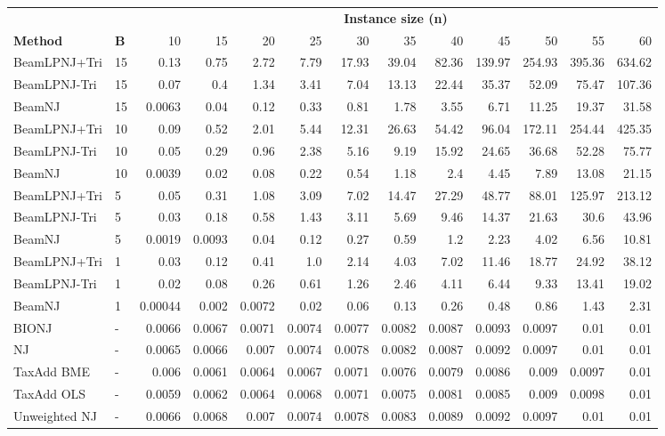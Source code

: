 \begin{tabular}{llrrrrrrrrrrr}
\toprule
&& \multicolumn{11}{c}{\textbf{Instance size (n)}} \\
\cmidrule(lr){3-13}
\textbf{Method} & \textbf{B} & 10 & 15 & 20 & 25 & 30 & 35 & 40 & 45 & 50 & 55 & 60 \\
\midrule
BeamLPNJ+Tri & 15 & 0.13 & 0.75 & 2.72 & 7.79 & 17.93 & 39.04 & 82.36 & 139.97 & 254.93 & 395.36 & 634.62 \\
BeamLPNJ-Tri & 15 & 0.07 & 0.4 & 1.34 & 3.41 & 7.04 & 13.13 & 22.44 & 35.37 & 52.09 & 75.47 & 107.36 \\
BeamNJ & 15 & 0.0063 & 0.04 & 0.12 & 0.33 & 0.81 & 1.78 & 3.55 & 6.71 & 11.25 & 19.37 & 31.58 \\
BeamLPNJ+Tri & 10 & 0.09 & 0.52 & 2.01 & 5.44 & 12.31 & 26.63 & 54.42 & 96.04 & 172.11 & 254.44 & 425.35 \\
BeamLPNJ-Tri & 10 & 0.05 & 0.29 & 0.96 & 2.38 & 5.16 & 9.19 & 15.92 & 24.65 & 36.68 & 52.28 & 75.77 \\
BeamNJ & 10 & 0.0039 & 0.02 & 0.08 & 0.22 & 0.54 & 1.18 & 2.4 & 4.45 & 7.89 & 13.08 & 21.15 \\
BeamLPNJ+Tri & 5 & 0.05 & 0.31 & 1.08 & 3.09 & 7.02 & 14.47 & 27.29 & 48.77 & 88.01 & 125.97 & 213.12 \\
BeamLPNJ-Tri & 5 & 0.03 & 0.18 & 0.58 & 1.43 & 3.11 & 5.69 & 9.46 & 14.37 & 21.63 & 30.6 & 43.96 \\
BeamNJ & 5 & 0.0019 & 0.0093 & 0.04 & 0.12 & 0.27 & 0.59 & 1.2 & 2.23 & 4.02 & 6.56 & 10.81 \\
BeamLPNJ+Tri & 1 & 0.03 & 0.12 & 0.41 & 1.0 & 2.14 & 4.03 & 7.02 & 11.46 & 18.77 & 24.92 & 38.12 \\
BeamLPNJ-Tri & 1 & 0.02 & 0.08 & 0.26 & 0.61 & 1.26 & 2.46 & 4.11 & 6.44 & 9.33 & 13.41 & 19.02 \\
BeamNJ & 1 & 0.00044 & 0.002 & 0.0072 & 0.02 & 0.06 & 0.13 & 0.26 & 0.48 & 0.86 & 1.43 & 2.31 \\
BIONJ & - & 0.0066 & 0.0067 & 0.0071 & 0.0074 & 0.0077 & 0.0082 & 0.0087 & 0.0093 & 0.0097 & 0.01 & 0.01 \\
NJ & - & 0.0065 & 0.0066 & 0.007 & 0.0074 & 0.0078 & 0.0082 & 0.0087 & 0.0092 & 0.0097 & 0.01 & 0.01 \\
TaxAdd BME & - & 0.006 & 0.0061 & 0.0064 & 0.0067 & 0.0071 & 0.0076 & 0.0079 & 0.0086 & 0.009 & 0.0097 & 0.01 \\
TaxAdd OLS & - & 0.0059 & 0.0062 & 0.0064 & 0.0068 & 0.0071 & 0.0075 & 0.0081 & 0.0085 & 0.009 & 0.0098 & 0.01 \\
Unweighted NJ & - & 0.0066 & 0.0068 & 0.007 & 0.0074 & 0.0078 & 0.0083 & 0.0089 & 0.0092 & 0.0097 & 0.01 & 0.01 \\
\bottomrule
\end{tabular}

